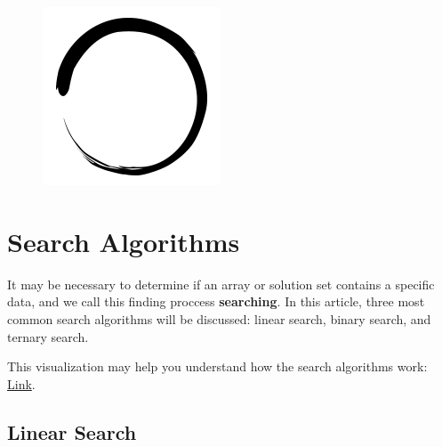 \documentclass[12pt]{article}
\title{\vspace{-2em}\mytitle\vspace{-0.3em}}
\author{
	\textbf{Editor}\\
	Kadir Emre Oto  \\ \ \\ 
	\textbf{Reviewers} \\ 
	Muhammed Burak Buğrul  \\
	Tahsin Enes Kuru
}
\date{}
\begin{document}
	
	\begin{figure}
		\centering
		\includegraphics[width=\linewidth/4]{inzva-logo.png}
		\label{fig:inzva}
	\end{figure}
	\maketitle
	
	\cleardoublepage
	\tableofcontents
	\cleardoublepage
	
	\section{Search Algorithms}
	
It may be necessary to determine if an array or solution set contains a specific data, and we call this finding proccess \textbf{searching}. In this article, three most common search algorithms will be discussed: linear search, binary search, and ternary search.

This visualization may help you understand how the search algorithms work: \href{https://www.cs.usfca.edu/~galles/visualization/Search.html}{Link}. 

		\subsection{Linear Search}
			
\end{document}
